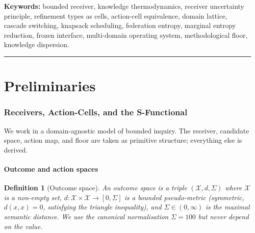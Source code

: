 \documentclass[twocolumn,11pt,a4paper]{article}
\newtheorem{definition}[theorem]{Definition}
\newcommand{\Cands}{\mathcal{X}}
\newcommand{\Sigmax}{\Sigma}
\begin{document}
\begin{abstract}
complexity bound, every theorem is verified by a numerical experiment whose results are persisted as JSON. The framework is independent of any prior work and self-contained in standard real analysis, lattice theory, information theory, and convex optimisation.
\end{abstract}

\noindent\textbf{Keywords:} bounded receiver, knowledge thermodynamics, receiver uncertainty principle, refinement types as cells, action-cell equivalence, domain lattice, cascade switching, knapsack scheduling, federation entropy, marginal entropy reduction, frozen interface, multi-domain operating system, methodological floor, knowledge dispersion.

\tableofcontents

\vspace{6pt}
\hrule
\vspace{6pt}

\part{Preliminaries}

\section{Receivers, Action-Cells, and the S-Functional}
\label{sec:preliminaries}

We work in a domain-agnostic model of bounded inquiry. The receiver, candidate space, action map, and floor are taken as primitive structure; everything else is derived.

\subsection{Outcome and action spaces}

\begin{definition}[Outcome space]
\label{def:outcome}
An \emph{outcome space} is a triple $(\Cands, d, \Sigmax)$ where $\Cands$ is a non-empty set, $d : \Cands \times \Cands \to [0, \Sigmax]$ is a bounded pseudo-metric (symmetric, $d(x,x)=0$, satisfying the triangle inequality), and $\Sigmax \in (0, \infty)$ is the maximal semantic distance. We use the canonical normalisation $\Sigmax = 100$ but never depend on the value.
\end{definition}
\end{document}
